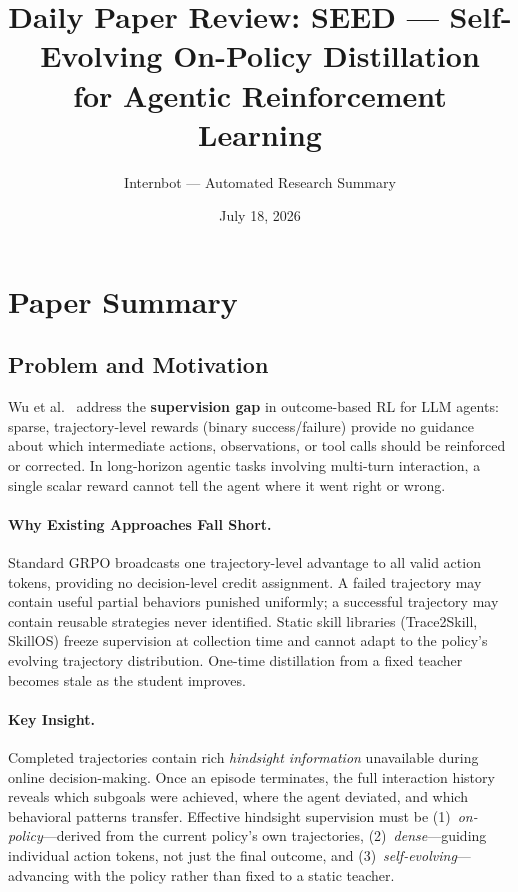 \documentclass[11pt,a4paper]{article}
\title{Daily Paper Review: SEED --- Self-Evolving On-Policy Distillation\\for Agentic Reinforcement Learning}
\author{Internbot --- Automated Research Summary}
\date{July 18, 2026}
\begin{document}
\maketitle

\section{Paper Summary}

\subsection{Problem and Motivation}

Wu et al.~\cite{wu2026seed} address the \textbf{supervision gap} in outcome-based RL for LLM agents: sparse, trajectory-level rewards (binary success/failure) provide no guidance about which intermediate actions, observations, or tool calls should be reinforced or corrected. In long-horizon agentic tasks involving multi-turn interaction, a single scalar reward cannot tell the agent where it went right or wrong.

\paragraph{Why Existing Approaches Fall Short.} Standard GRPO broadcasts one trajectory-level advantage to all valid action tokens, providing no decision-level credit assignment. A failed trajectory may contain useful partial behaviors punished uniformly; a successful trajectory may contain reusable strategies never identified. Static skill libraries (Trace2Skill, SkillOS) freeze supervision at collection time and cannot adapt to the policy's evolving trajectory distribution. One-time distillation from a fixed teacher becomes stale as the student improves.

\paragraph{Key Insight.} Completed trajectories contain rich \emph{hindsight information} unavailable during online decision-making. Once an episode terminates, the full interaction history reveals which subgoals were achieved, where the agent deviated, and which behavioral patterns transfer. Effective hindsight supervision must be (1)~\emph{on-policy}---derived from the current policy's own trajectories, (2)~\emph{dense}---guiding individual action tokens, not just the final outcome, and (3)~\emph{self-evolving}---advancing with the policy rather than fixed to a static teacher.
\end{document}
